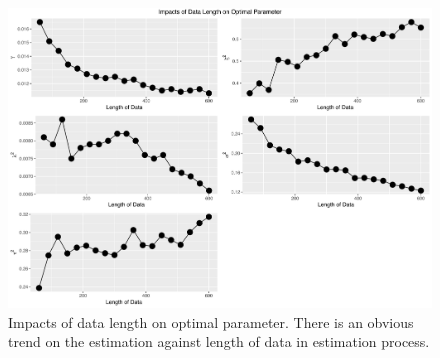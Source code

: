 \begin{figure}[h]
\centering
\includegraphics[width=\textwidth,height=0.5\textheight]{Chapters/05MCMCOU/plots/realdatalengthcompare.pdf}
\caption{Impacts of data length on optimal parameter. There is an obvious trend on the estimation against length of data in estimation process. }
\end{figure}



